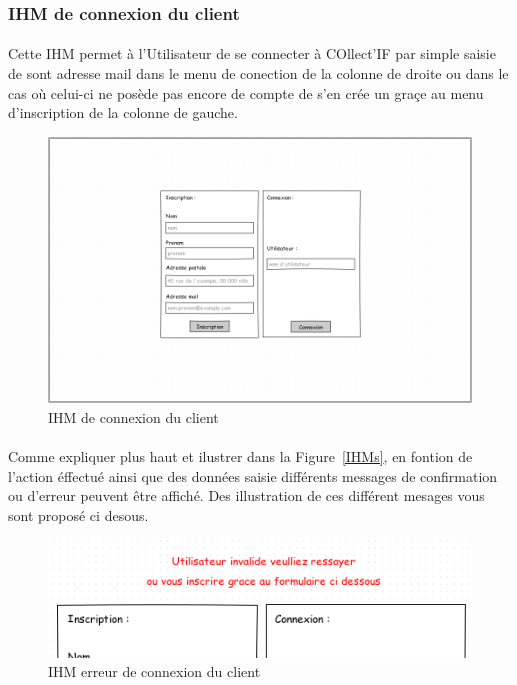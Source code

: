 \documentclass[a4paper,11pt]{article}
\begin{document}
\subsubsection{IHM de connexion du client}

\paragraph{}
Cette IHM permet à l'Utilisateur de se connecter à COllect'IF par simple saisie de sont adresse mail dans le menu de conection de la colonne de droite ou dans le cas où celui-ci ne posède pas encore de compte de s'en crée un graçe au menu d'inscription de la colonne de gauche.

\begin{figure}[H]
  \begin{center}
    \includegraphics[width=15cm]{../../IHM/IHM_connection_utilisateur.png}
    \caption{IHM de connexion du client}
  \end{center}
\end{figure}

\paragraph{}
Comme expliquer plus haut et ilustrer dans la Figure~\ref{IHMs}, en fontion de l'action éffectué ainsi que des données saisie différents messages de confirmation ou d'erreur peuvent être affiché. Des illustration de ces différent mesages vous sont proposé ci desous.

\begin{figure}[H]
  \begin{center}
    \includegraphics[width=15cm]{../../IHM/IHM_connection_utilisateur_erreur_co_z.png}
    \caption{IHM erreur de connexion du client}
  \end{center}
\end{figure}
\end{document}
